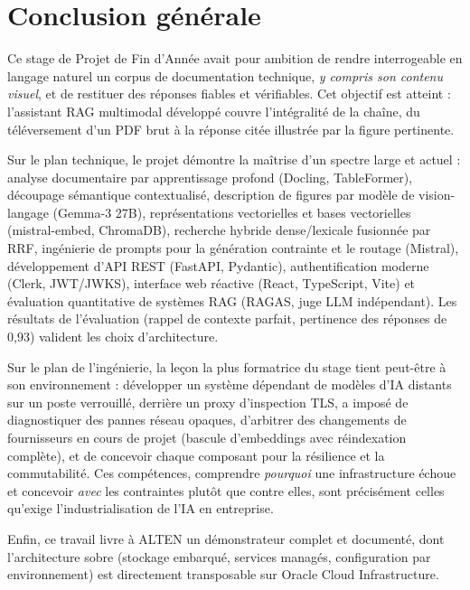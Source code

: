 \chapter*{Conclusion générale}

Ce stage de Projet de Fin d'Année avait pour ambition de rendre interrogeable en langage
naturel un corpus de documentation technique, \emph{y compris son contenu visuel}, et de
restituer des réponses fiables et vérifiables. Cet objectif est atteint : l'assistant RAG
multimodal développé couvre l'intégralité de la chaîne, du téléversement d'un PDF brut à la
réponse citée illustrée par la figure pertinente.

Sur le plan technique, le projet démontre la maîtrise d'un spectre large et actuel :
analyse documentaire par apprentissage profond (Docling, TableFormer), découpage sémantique
contextualisé, description de figures par modèle de vision-langage (Gemma-3 27B),
représentations vectorielles et bases vectorielles (mistral-embed, ChromaDB), recherche
hybride dense/lexicale fusionnée par RRF, ingénierie de prompts pour la génération
contrainte et le routage (Mistral), développement d'API REST (FastAPI, Pydantic),
authentification moderne (Clerk, JWT/JWKS), interface web réactive (React, TypeScript,
Vite) et évaluation quantitative de systèmes RAG (RAGAS, juge LLM indépendant). Les
résultats de l'évaluation (rappel de contexte parfait, pertinence des réponses de 0{,}93)
valident les choix d'architecture.

Sur le plan de l'ingénierie, la leçon la plus formatrice du stage tient peut-être à son
environnement : développer un système dépendant de modèles d'IA distants sur un poste
verrouillé, derrière un proxy d'inspection TLS, a imposé de diagnostiquer des pannes
réseau opaques, d'arbitrer des changements de fournisseurs en cours de projet (bascule
d'embeddings avec réindexation complète), et de concevoir chaque composant pour la
résilience et la commutabilité. Ces compétences, comprendre \emph{pourquoi} une
infrastructure échoue et concevoir \emph{avec} les contraintes plutôt que contre elles,
sont précisément celles qu'exige l'industrialisation de l'IA en entreprise.

Enfin, ce travail livre à ALTEN un démonstrateur complet et documenté, dont l'architecture
sobre (stockage embarqué, services managés, configuration par environnement) est
directement transposable sur Oracle Cloud Infrastructure.

